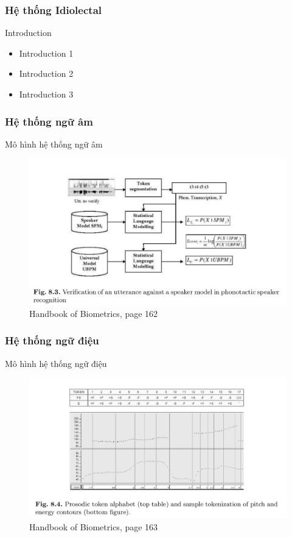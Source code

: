 \documentclass[11pt]{beamer}
\begin{document}
\subsubsection{Hệ thống Idiolectal}
\begin{frame}{Introduction}
	\begin{itemize}
		\item Introduction 1
		\item Introduction 2
		\item Introduction 3
	\end{itemize}
\end{frame}
\subsubsection{Hệ thống ngữ âm}
\begin{frame}{Mô hình hệ thống ngữ âm}
	\begin{figure}[h!]
		\includegraphics[width=0.9\linewidth]{images/figure_8_3.png}
		\caption{Handbook of Biometrics, page 162}
		\label{fig:writing-thesis}
	\end{figure}
\end{frame}	
\subsubsection{Hệ thống ngữ điệu}
\begin{frame}{Mô hình hệ thống ngữ điệu}
	\begin{figure}[h!]
		\includegraphics[width=0.9\linewidth]{images/figure_8_4.png}
		\caption{Handbook of Biometrics, page 163}
		\label{fig:writing-thesis}
	\end{figure}
\end{frame}	
\end{document}
